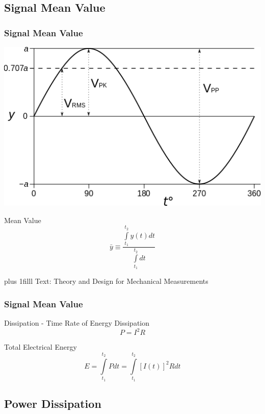 \documentclass[fleqn]{beamer} %
\newcommand{\sectionIIsubsectionItitle}{Signal Mean Value}
\newcommand{\sectionIIsubsectionIItitle}{Power Dissipation}
\newcommand{\btVFill}{\vskip0pt plus 1filll}
\begin{document}
		\subsection{\sectionIIsubsectionItitle}\label{sectionIIsubsectionI}

			\begin{frame}[label=sectionIIsubsectionI]
				\frametitle{\sectionIIsubsectionItitle}

						\begin{multicols}{2}
		\includegraphics[scale=.30]{images/amplitude_frequency.png} 
		
 Mean Value \[\bar{y}\equiv \frac{\int\limits_{t_1}^{t_2} y(t)dt}{\int\limits_{t_1}^{t_2} dt} \]
		\end{multicols}
		\btVFill
		\tiny{Text: Theory and Design for Mechanical Measurements}

		
			\end{frame}

		    \begin{frame}[label=sectionIIsubsectionI]
				\frametitle{\sectionIIsubsectionItitle}

				Dissipation - Time Rate of Energy Dissipation    \[ P=I^2R \]  
	
	Total Electrical Energy \hspace{5mm} \[ E =\int\limits_{t_1}^{t_2}P dt=\int\limits_{t_1}^{t_2}[I(t)]^2R dt \]
		
		



			\end{frame}	

		\subsection{\sectionIIsubsectionIItitle}\label{sectionIIsubsectionII}
\end{document}
